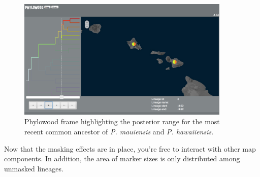 
\begin{figure}[H]
\centering
\includegraphics[width=4in]{../RB_Biogeography_Tutorial/figures/phw_br23}
\caption{Phylowood frame highlighting the posterior range for the most recent common ancestor of {\it P. mauiensis} and {\it P. hawaiiensis}.}
\end{figure}

Now that the masking effects are in place, you're free to interact with other map components.
In addition, the area of marker sizes is only distributed among unmasked lineages.


%

